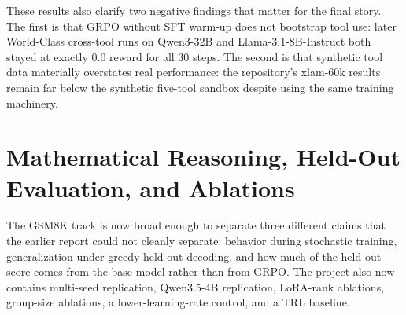 These results also clarify two negative findings that matter for the final
story. The first is that GRPO without SFT warm-up does not bootstrap tool use:
later World-Class cross-tool runs on Qwen3-32B and Llama-3.1-8B-Instruct both
stayed at exactly 0.0 reward for all 30 steps. The second is that synthetic
tool data materially overstates real performance: the repository's xlam-60k
results remain far below the synthetic five-tool sandbox despite using the same
training machinery.

\section*{Mathematical Reasoning, Held-Out Evaluation, and Ablations}

The GSM8K track is now broad enough to separate three different claims that the
earlier report could not cleanly separate: behavior during stochastic training,
generalization under greedy held-out decoding, and how much of the held-out
score comes from the base model rather than from GRPO. The project also now
contains multi-seed replication, Qwen3.5-4B replication, LoRA-rank ablations,
group-size ablations, a lower-learning-rate control, and a TRL baseline.

